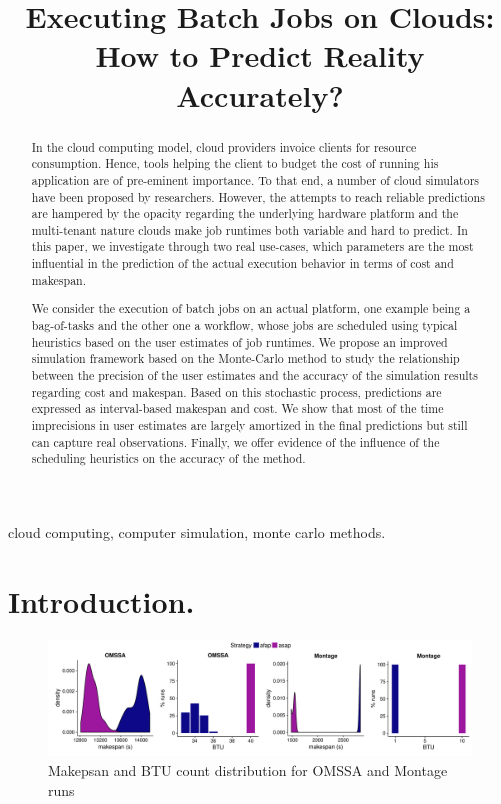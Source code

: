 \documentclass[10pt,conference,compsocconf]{IEEEtran}
\title{Executing Batch Jobs on Clouds: How to Predict Reality Accurately?}
\author{\IEEEauthorblockN{Luke~Bertot 
			and Stéphane~Genaud 
			and Julien~Gossa}
	\IEEEauthorblockA{Icube-ICPS --- UMR 7357, Univeristé de Strasbourg, CNRS\\
		P\^ole API Blvd S. Bant, 67400 Illkirch\\
		email: \url{lbertot@unistra.fr}, \url{genaud@unistra.fr}, \url{gossa@unistra.fr}}
	}
\begin{document}
\maketitle

\begin{abstract}
  In the  cloud computing  model, cloud providers  invoice clients  for resource
  consumption. Hence, tools helping the client to budget the cost of running his
  application are  of pre-eminent  importance. To  that end,  a number  of cloud
  simulators have been  proposed by researchers. However, the  attempts to reach
  reliable  predictions are  hampered by  the opacity  regarding the  underlying
  hardware platform  and the  multi-tenant nature  clouds make job
  runtimes both  variable and hard to  predict.  In this paper,  we investigate
  through two real  use-cases, which parameters are the most  influential in the
  prediction of the actual execution behavior in terms of cost and makespan.

  We consider the execution  of batch jobs on an  actual platform, one example
  being a  bag-of-tasks and the other  one a workflow, whose  jobs are scheduled
  using typical  heuristics based on  the user  estimates of job  runtimes.  We
  propose an  improved simulation framework  based on the Monte-Carlo  method to
  study the  relationship between the  precision of  the user estimates  and the
  accuracy of the simulation results regarding  cost and makespan. Based on this
  stochastic process,  predictions are expressed as  interval-based makespan and
  cost.   We show  that  most  of the time imprecisions  in  user estimates are
  largely amortized in the final predictions but still can capture real
  observations. Finally, we offer evidence of the influence of the scheduling 
  heuristics on the accuracy of the method.
 
\end{abstract}

\begin{IEEEkeywords}
cloud computing, computer simulation, monte carlo methods.
\end{IEEEkeywords}

\tableofcontents

\section{Introduction.}
\begin{figure}
	\centering
	\includegraphics[width=\textwidth]{gfx/real_plot.pdf}
	\caption{Makepsan and BTU count distribution for OMSSA and Montage
	runs\label{fig:realbrs}}
\end{figure}
\end{document}
